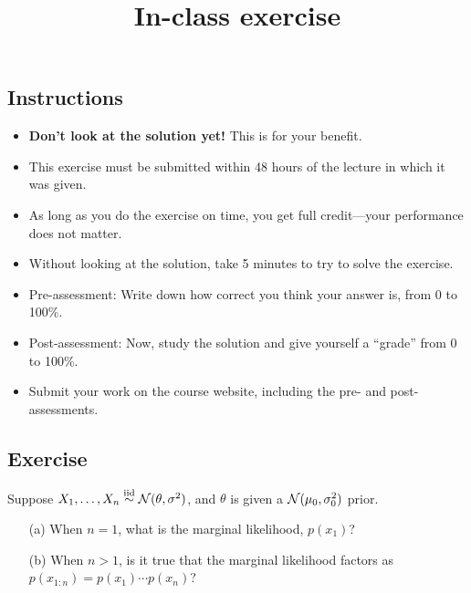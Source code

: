 \documentclass[12pt]{article}
\title{In-class exercise}
\author{}
\date{}
\begin{document}
\maketitle

\subsection*{Instructions}
\begin{itemize}
\item \textbf{Don't look at the solution yet!} This is for your benefit.
\item This exercise must be submitted within 48 hours of the lecture in which it was given. 
\item As long as you do the exercise on time, you get full credit---your performance does not matter.
\item Without looking at the solution, take 5 minutes to try to solve the exercise.
\item Pre-assessment: Write down how correct you think your answer is, from 0 to 100\%.
\item Post-assessment: Now, study the solution and give yourself a ``grade'' from 0 to 100\%.
\item Submit your work on the course website, including the pre- and post- assessments.
\end{itemize}

\subsection*{Exercise}
Suppose $X_1,\dotsc,X_n\stackrel{\mathrm{iid}}{\sim}\mathcal{N}(\theta,\sigma^2)$, and $\theta$ is given a $\mathcal{N}(\mu_0,\sigma_0^2)$ prior.
\begin{itemize}
\item[(a)] When $n=1$, what is the marginal likelihood, $p(x_1)$? %
\item[(b)] When $n>1$, is it true that the marginal likelihood factors as $p(x_{1:n}) = p(x_1)\cdots p(x_n)$?
\end{itemize}
\end{document}
